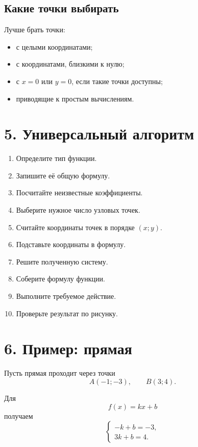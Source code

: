 \documentclass[a4paper,12pt]{article}
\newcommand{\sepLine}{\par\vspace{2mm}{\color{lightaccent}\rule{\linewidth}{0.8pt}}\vspace{2mm}}
\begin{document}
\subsection*{Какие точки выбирать}

Лучше брать точки:

\begin{itemize}
  \item с целыми координатами;
  \item с координатами, близкими к нулю;
  \item с $x=0$ или $y=0$, если такие точки доступны;
  \item приводящие к простым вычислениям.
\end{itemize}

\sepLine

\section*{\textcolor{darkaccent}{5. Универсальный алгоритм}}

\begin{enumerate}
  \item Определите тип функции.
  \item Запишите её общую формулу.
  \item Посчитайте неизвестные коэффициенты.
  \item Выберите нужное число узловых точек.
  \item Считайте координаты точек в порядке $(x;y)$.
  \item Подставьте координаты в формулу.
  \item Решите полученную систему.
  \item Соберите формулу функции.
  \item Выполните требуемое действие.
  \item Проверьте результат по рисунку.
\end{enumerate}

\sepLine

\section*{\textcolor{darkaccent}{6. Пример: прямая}}

Пусть прямая проходит через точки
\[
A(-1;-3),
\qquad
B(3;4).
\]

Для
\[
f(x)=kx+b
\]
получаем
\[
\begin{cases}
-k+b=-3,\\
3k+b=4.
\end{cases}
\]
\end{document}
